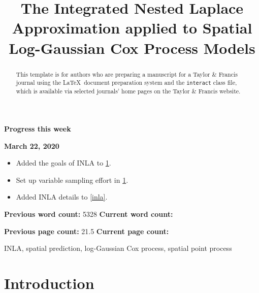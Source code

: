 \documentclass[]{interact}
\begin{document}
{\Large\bf Progress this week}

{\large\bf March 22, 2020}

\begin{itemize}

\item Added the goals of INLA to \ref{intro}.

\item Set up variable sampling effort in \ref{intro}.

\item Added INLA details to \ref{inla}.

\end{itemize}

\vfill

\textbf{Previous word count:} 5328 \hfill \textbf{Current word count:} 

\textbf{Previous page count:} 21.5 \hfill \textbf{Current page count:} 

\pagebreak


\title{The Integrated Nested Laplace Approximation applied to Spatial Log-Gaussian Cox Process Models}

\author{
}

\maketitle

\begin{abstract}
This template is for authors who are preparing a manuscript for a Taylor \& Francis journal using the \LaTeX\ document preparation system and the \texttt{interact} class file, which is available via selected journals' home pages on the Taylor \& Francis website.
\end{abstract}

\begin{keywords}
INLA, spatial prediction, log-Gaussian Cox process, spatial point process
\end{keywords}


\section{Introduction}
\label{intro}
\end{document}
